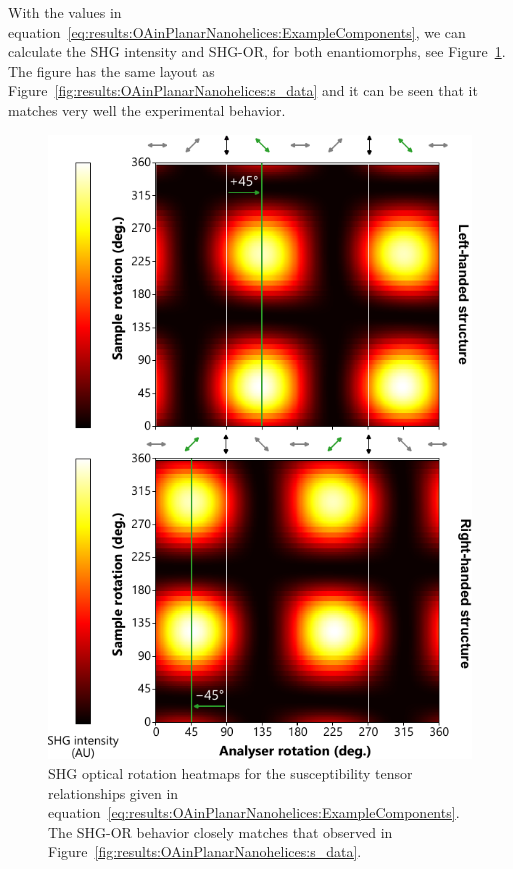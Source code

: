 With the values in equation~\ref{eq:results:OAinPlanarNanohelices:ExampleComponents}, we can calculate the SHG intensity and SHG-OR, for both enantiomorphs, see Figure~\ref{fig:results:OAinPlanarNanohelices:sim_data}. 
The figure has the same layout as Figure~\ref{fig:results:OAinPlanarNanohelices:s_data} and it can be seen that it matches very well the experimental behavior. 
\begin{figure}[htb!]	
    \centering	
    \includegraphics[scale=1]{./figures/results/OAinPlanarNanohelices/sim_data.pdf}

    \caption{\label{fig:results:OAinPlanarNanohelices:sim_data}
    SHG optical rotation heatmaps for the susceptibility tensor relationships given in equation~\ref{eq:results:OAinPlanarNanohelices:ExampleComponents}. The SHG-OR behavior closely matches that observed in Figure~\ref{fig:results:OAinPlanarNanohelices:s_data}.}
\end{figure}

